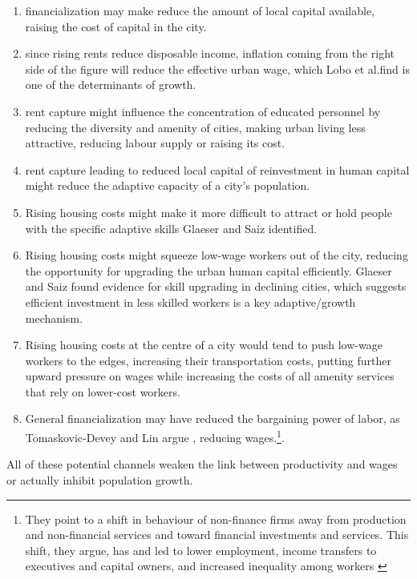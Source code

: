  
\begin{enumerate}
\item financialization may make reduce the amount of local capital available, raising the cost of capital in the city. 
    
\item since rising rents reduce disposable income, inflation coming from the right  side of the figure will reduce  the effective urban wage, which Lobo et al.find is one of the determinants of growth.

\item rent capture might influence the concentration of educated personnel by reducing the diversity and amenity of cities, making urban living less attractive, reducing labour supply or raising its cost.

\item rent capture leading to reduced local capital of reinvestment in human capital  might reduce the adaptive capacity of a city's population.

\item Rising housing costs might make it more difficult to attract or hold people with the specific adaptive skills Glaeser and Saiz identified.

\item  Rising housing costs might squeeze low-wage workers out of the city, reducing the opportunity for upgrading the urban human capital efficiently. Glaeser and Saiz found   evidence for skill upgrading  in declining cities, which suggests efficient investment in less skilled workers is a key adaptive/growth mechanism. 

\item Rising housing costs at the centre of a city would tend to push low-wage workers to the edges, increasing their transportation costs, putting further upward pressure on wages while increasing the costs of all amenity services that rely on lower-cost workers.

\item General financialization may have reduced the bargaining power of labor, as Tomaskovic-Devey and Lin  argue \cite{tomaskovic-deveyFinancializationCausesInequality2013}, reducing wages.\footnote{They point to a shift in behaviour of non-finance firms away from production and non-financial services and toward financial investments and services. This shift, they  argue,  has and led to lower employment, income transfers to executives and capital owners, and increased inequality among workers \cite{tomaskovic-deveyFinancializationCausesInequality2013}}.
\end{enumerate}
All of these potential channels weaken the link between productivity and wages or actually inhibit population growth.


